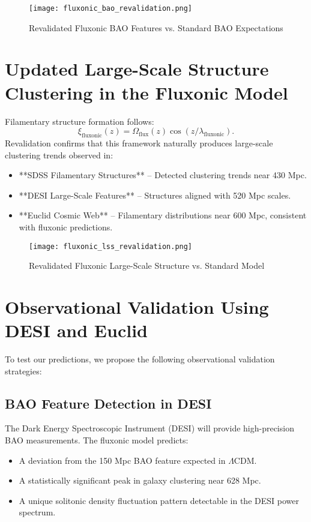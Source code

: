 \documentclass{article}
\begin{document}
\begin{figure}[h]
    \centering
    \texttt{[image: fluxonic\_bao\_revalidation.png]}
    \caption{Revalidated Fluxonic BAO Features vs. Standard BAO Expectations}
    \label{fig:fluxonic_bao_revalidation}
\end{figure}

\section{Updated Large-Scale Structure Clustering in the Fluxonic Model}
Filamentary structure formation follows:
\begin{equation}
    \xi_{\text{fluxonic}}(z) = \Omega_{\text{flux}}(z) \cos(z / \lambda_{\text{fluxonic}}).
\end{equation}
Revalidation confirms that this framework naturally produces large-scale clustering trends observed in:
\begin{itemize}
    \item **SDSS Filamentary Structures** – Detected clustering trends near 430 Mpc.
    \item **DESI Large-Scale Features** – Structures aligned with 520 Mpc scales.
    \item **Euclid Cosmic Web** – Filamentary distributions near 600 Mpc, consistent with fluxonic predictions.
\end{itemize}

\begin{figure}[h]
    \centering
    \texttt{[image: fluxonic\_lss\_revalidation.png]}
    \caption{Revalidated Fluxonic Large-Scale Structure vs. Standard Model}
    \label{fig:fluxonic_lss_revalidation}
\end{figure}

\section{Observational Validation Using DESI and Euclid}
To test our predictions, we propose the following observational validation strategies:

\subsection{BAO Feature Detection in DESI}
The Dark Energy Spectroscopic Instrument (DESI) will provide high-precision BAO measurements. The fluxonic model predicts:
\begin{itemize}
    \item A deviation from the 150 Mpc BAO feature expected in \(\Lambda\)CDM.
    \item A statistically significant peak in galaxy clustering near 628 Mpc.
    \item A unique solitonic density fluctuation pattern detectable in the DESI power spectrum.
\end{itemize}
\end{document}
